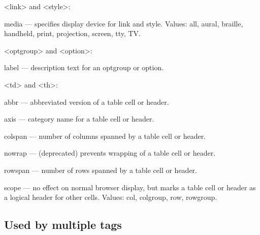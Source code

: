 \begin{compactitem}
\item <link> and <style>:

	\begin{compactitem}
	\item media — specifies display device for link and style. Values: all, aural, braille, handheld, print, projection, screen, tty, TV.
	\end{compactitem}
	
\item <optgroup> and <option>:

	\begin{compactitem}
	\item label — description text for an optgroup or option.
	\end{compactitem}
	
\item <td> and <th>:

	\begin{compactitem}
	\item abbr — abbreviated version of a table cell or header.
	\item axis — category name for a table cell or header.
	\item colspan — number of columns spanned by a table cell or header.
	\item nowrap — (deprecated) prevents wrapping of a table cell or header.
	\item rowspan — number of rows spanned by a table cell or header.
	\item scope — no effect on normal browser display, but marks a table cell or header as a logical header for other cells. Values: col, colgroup, row, rowgroup.
	\end{compactitem}
	
\end{compactitem}








\subsection{Used by multiple tags}

